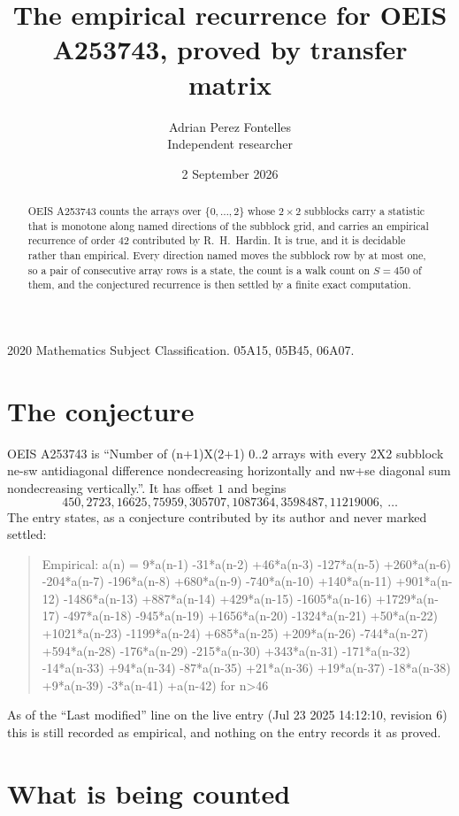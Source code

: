 \documentclass[11pt,a4paper]{article}
\title{The empirical recurrence for OEIS A253743, proved by transfer matrix}
\author{Adrian Perez Fontelles\\ \small Independent researcher}
\date{2 September 2026}
\theoremstyle{plain}
\theoremstyle{definition}
\begin{document}
\maketitle

\begin{abstract}
OEIS A253743 counts the arrays over $\{0,\dots,2\}$ whose $2\times2$ subblocks carry a
statistic that is monotone along named directions of the subblock grid, and carries an
empirical recurrence of order $42$ contributed by R.~H.~Hardin. It is true, and it is
decidable rather than empirical. Every direction named moves the subblock row by at most one,
so a pair of consecutive array rows is a state, the count is a walk count on $S=450$ of them,
and the conjectured recurrence is then settled by a finite exact computation.
\end{abstract}

\noindent\small 2020 Mathematics Subject Classification. 05A15, 05B45, 06A07.\normalsize

\section{The conjecture}

OEIS A253743 is ``Number of (n+1)X(2+1) 0..2 arrays with every 2X2 subblock ne-sw antidiagonal difference nondecreasing horizontally and nw+se diagonal sum nondecreasing vertically.''. It has offset $1$ and begins
\[
450, 2723, 16625, 75959, 305707, 1087364, 3598487, 11219006,\ \dots
\]
The entry states, as a conjecture contributed by its author and never marked settled:
\begin{quote}
Empirical: a(n) = 9*a(n-1) -31*a(n-2) +46*a(n-3) -127*a(n-5) +260*a(n-6) -204*a(n-7) -196*a(n-8) +680*a(n-9) -740*a(n-10) +140*a(n-11) +901*a(n-12) -1486*a(n-13) +887*a(n-14) +429*a(n-15) -1605*a(n-16) +1729*a(n-17) -497*a(n-18) -945*a(n-19) +1656*a(n-20) -1324*a(n-21) +50*a(n-22) +1021*a(n-23) -1199*a(n-24) +685*a(n-25) +209*a(n-26) -744*a(n-27) +594*a(n-28) -176*a(n-29) -215*a(n-30) +343*a(n-31) -171*a(n-32) -14*a(n-33) +94*a(n-34) -87*a(n-35) +21*a(n-36) +19*a(n-37) -18*a(n-38) +9*a(n-39) -3*a(n-41) +a(n-42) for n>46
\end{quote}
As of the ``Last modified'' line on the live entry (Jul 23 2025 14:12:10, revision 6) this is still
recorded as empirical, and nothing on the entry records it as proved.

\section{What is being counted}
\end{document}
